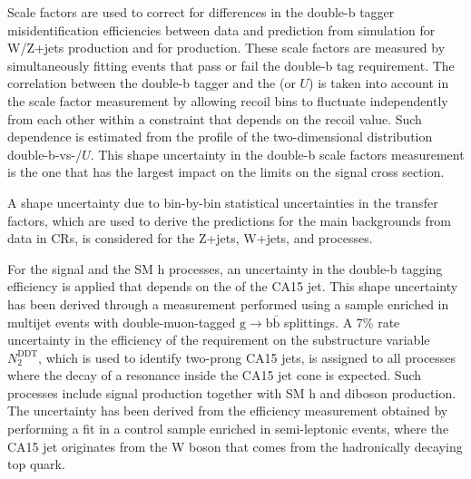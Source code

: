 Scale factors are used to correct for differences in the double-b tagger misidentification efficiencies between data and prediction from simulation for W/Z+jets production and for \ttbar production. These scale factors are measured by simultaneously fitting events that pass or fail the double-b tag requirement. The correlation between the double-b tagger and the \ptmiss (or $U$) is taken into account in the scale factor measurement by allowing recoil bins to fluctuate independently from each other within a constraint that depends on the recoil value. Such dependence is estimated from the profile of the two-dimensional distribution double-b-vs-\ptmiss/$U$. This shape uncertainty in the double-b scale factors measurement is the one that has the largest impact on the limits on the signal cross section.

A shape uncertainty due to bin-by-bin statistical uncertainties in the transfer factors, which are used to derive the predictions for the main backgrounds from data in CRs, is considered for the Z+jets, W+jets, and \ttbar processes.

For the signal and the SM h processes, an uncertainty in the double-b tagging efficiency is applied that depends on the \pt of the CA15 jet. This shape uncertainty has been derived through a measurement performed using a sample enriched in multijet events with double-muon-tagged $\text{g}\to\text{b}\bar{\text{b}}$ splittings. A 7\% rate uncertainty in the efficiency of the requirement on the substructure variable $N_2^\text{DDT}$, which is used to identify two-prong CA15 jets, is assigned to all processes where the decay of a resonance inside the CA15 jet cone is expected. Such processes include signal production together with SM h and diboson production. The uncertainty has been derived from the efficiency measurement obtained by performing a fit in a control sample enriched in semi-leptonic \ttbar events, where the CA15 jet originates from the W boson that comes from the hadronically decaying top quark. 


